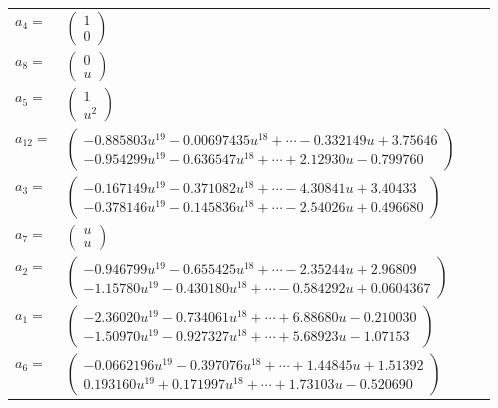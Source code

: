 \documentclass[1p]{elsarticle_modified}
\theoremstyle{definition}
\begin{document}
\begin{tabular}{m{7pt} m{180pt} m{7pt} m{180pt} }
\flushright $a_{4}=$&$\begin{pmatrix}1\\0\end{pmatrix}$ \\
\flushright $a_{8}=$&$\begin{pmatrix}0\\u\end{pmatrix}$ \\
\flushright $a_{5}=$&$\begin{pmatrix}1\\u^2\end{pmatrix}$ \\
\flushright $a_{12}=$&$\begin{pmatrix}-0.885803 u^{19}-0.00697435 u^{18}+\cdots-0.332149 u+3.75646\\-0.954299 u^{19}-0.636547 u^{18}+\cdots+2.12930 u-0.799760\end{pmatrix}$ \\
\flushright $a_{3}=$&$\begin{pmatrix}-0.167149 u^{19}-0.371082 u^{18}+\cdots-4.30841 u+3.40433\\-0.378146 u^{19}-0.145836 u^{18}+\cdots-2.54026 u+0.496680\end{pmatrix}$ \\
\flushright $a_{7}=$&$\begin{pmatrix}u\\u\end{pmatrix}$ \\
\flushright $a_{2}=$&$\begin{pmatrix}-0.946799 u^{19}-0.655425 u^{18}+\cdots-2.35244 u+2.96809\\-1.15780 u^{19}-0.430180 u^{18}+\cdots-0.584292 u+0.0604367\end{pmatrix}$ \\
\flushright $a_{1}=$&$\begin{pmatrix}-2.36020 u^{19}-0.734061 u^{18}+\cdots+6.88680 u-0.210030\\-1.50970 u^{19}-0.927327 u^{18}+\cdots+5.68923 u-1.07153\end{pmatrix}$ \\
\flushright $a_{6}=$&$\begin{pmatrix}-0.0662196 u^{19}-0.397076 u^{18}+\cdots+1.44845 u+1.51392\\0.193160 u^{19}+0.171997 u^{18}+\cdots+1.73103 u-0.520690\end{pmatrix}$ \\

\end{tabular}
\end{document}
